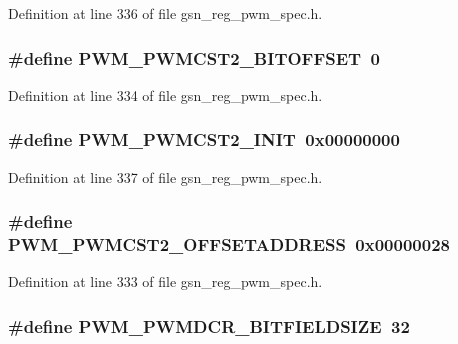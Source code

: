 Definition at line 336 of file gsn\_\-reg\_\-pwm\_\-spec.h.

\hypertarget{a00565_a89186f7b73a1c8ae73069751717eaa4c}{
\subsubsection[{PWM\_\-PWMCST2\_\-BITOFFSET}]{\setlength{\rightskip}{0pt plus 5cm}\#define PWM\_\-PWMCST2\_\-BITOFFSET~0}}
\label{a00565_a89186f7b73a1c8ae73069751717eaa4c}


Definition at line 334 of file gsn\_\-reg\_\-pwm\_\-spec.h.

\hypertarget{a00565_ac7897dc0dc26dfd99dd2e6d8a07cdbd9}{
\subsubsection[{PWM\_\-PWMCST2\_\-INIT}]{\setlength{\rightskip}{0pt plus 5cm}\#define PWM\_\-PWMCST2\_\-INIT~0x00000000}}
\label{a00565_ac7897dc0dc26dfd99dd2e6d8a07cdbd9}


Definition at line 337 of file gsn\_\-reg\_\-pwm\_\-spec.h.

\hypertarget{a00565_a81bdbb774320c60d5ed169b4f5cb833d}{
\subsubsection[{PWM\_\-PWMCST2\_\-OFFSETADDRESS}]{\setlength{\rightskip}{0pt plus 5cm}\#define PWM\_\-PWMCST2\_\-OFFSETADDRESS~0x00000028}}
\label{a00565_a81bdbb774320c60d5ed169b4f5cb833d}


Definition at line 333 of file gsn\_\-reg\_\-pwm\_\-spec.h.

\hypertarget{a00565_adeda64484cdf91ad6227b3e202923a56}{
\subsubsection[{PWM\_\-PWMDCR\_\-BITFIELDSIZE}]{\setlength{\rightskip}{0pt plus 5cm}\#define PWM\_\-PWMDCR\_\-BITFIELDSIZE~32}}
\label{a00565_adeda64484cdf91ad6227b3e202923a56}


